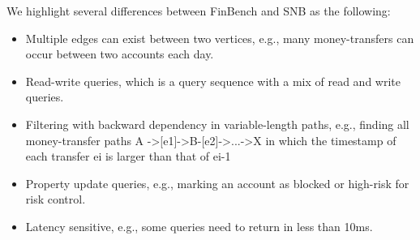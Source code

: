 We highlight several differences between FinBench and SNB as the following:
\begin{itemize}
    \item Multiple edges can exist between two vertices, e.g., many
    money-transfers can occur between two accounts each day.
    \item Read-write queries, which is a query sequence with a mix of read and
    write queries.
    \item Filtering with backward dependency in variable-length paths, e.g.,
    finding all money-transfer paths A ->[e1]->B-[e2]->...->X  in which the
    timestamp of each transfer ei  is larger than that of ei-1
    \item Property update queries, e.g., marking an account as blocked or
    high-risk for risk control.
    \item Latency sensitive, e.g., some queries need to return in less than
    10ms.
\end{itemize}

